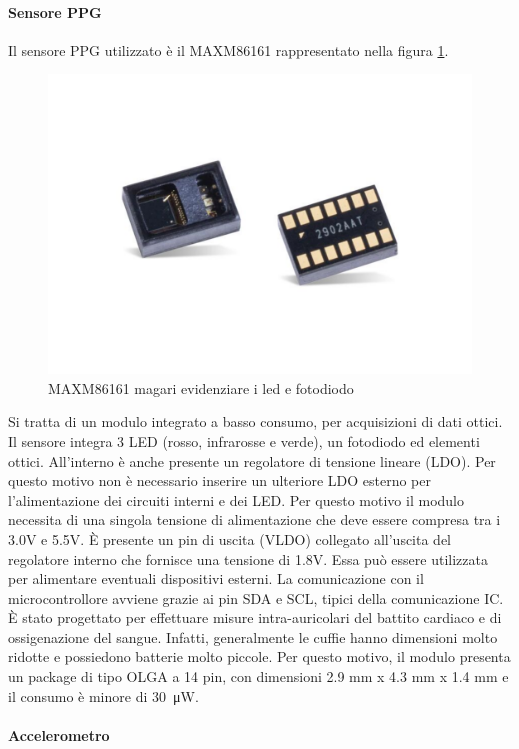 \paragraph{Sensore PPG} Il sensore PPG utilizzato è il MAXM86161 rappresentato nella figura \ref{fig:ImmagineMAXM86161}.
\begin{figure}[tb]
	\centering
	\includegraphics[width=0.6\linewidth]{ImageFiles/Hardware/ImmagineMAXM86161}
	\caption{MAXM86161 magari evidenziare i led e fotodiodo}
	\label{fig:ImmagineMAXM86161}
\end{figure}
Si tratta di un modulo integrato a basso consumo, per acquisizioni di dati ottici. Il sensore integra 3 LED (rosso, infrarosse e verde), un fotodiodo ed elementi ottici. All'interno è anche presente un regolatore di tensione lineare (LDO). Per questo motivo non è necessario inserire un ulteriore LDO esterno per l'alimentazione dei circuiti interni e dei LED. Per questo motivo il modulo necessita di una singola tensione di alimentazione che deve essere compresa tra i 3.0V e 5.5V. \`E presente un pin di uscita (VLDO) collegato all'uscita del regolatore interno che fornisce una tensione di 1.8V. Essa può essere utilizzata per alimentare eventuali dispositivi esterni. La comunicazione con il microcontrollore avviene grazie ai pin SDA e SCL, tipici della comunicazione IC. \`E stato progettato per effettuare misure intra-auricolari del battito cardiaco e di ossigenazione del sangue. Infatti, generalmente le cuffie hanno dimensioni molto ridotte e possiedono batterie molto piccole. Per questo motivo, il modulo presenta un package di tipo OLGA a 14 pin, con dimensioni 2.9 mm x 4.3 mm x 1.4 mm e il consumo è minore di \SI{30}{\micro\watt}.
\paragraph{Accelerometro}

